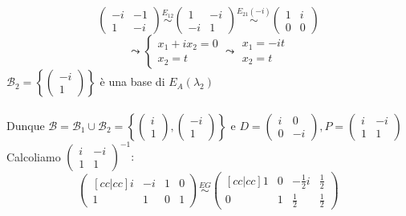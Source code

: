 \documentclass[12pt]{article}
\begin{document}
\[\begin{pmatrix}
    -i & -1\\
    1 & -i
\end{pmatrix} \stackrel{E_{12}}{\sim} \begin{pmatrix}
    1 & -i\\
    -i & 1
\end{pmatrix} \stackrel{E_{21}(-i)}{\sim} \begin{pmatrix}
    1 & i\\
    0 & 0
\end{pmatrix}\]
\[\leadsto \begin{cases}
    x_1 + ix_2 = 0\\
    x_2 = t
\end{cases} \leadsto \begin{matrix}
    x_1 = -it\\
    x_2 = t
\end{matrix}\]
$\mathcal{B}_2 = \left\{\begin{pmatrix}
    -i\\
    1
\end{pmatrix}\right\}$ è una base di $E_A(\lambda_2)$\\\\
Dunque $\mathcal{B} = \mathcal{B}_1 \cup \mathcal{B_2} = \left\{\begin{pmatrix}
    i\\
    1
\end{pmatrix}, \begin{pmatrix}
    -i\\
    1
\end{pmatrix}\right\}$ e $D= \begin{pmatrix}
    i & 0\\
    0 & -i
\end{pmatrix}, P = \begin{pmatrix}
    i & -i\\
    1 & 1
\end{pmatrix}$\\
Calcoliamo $\begin{pmatrix}
    i & -i\\
    1 & 1
\end{pmatrix}^{-1}:$
\[\begin{pmatrix}[cc|cc]
    i & -i & 1 & 0\\
    1 & 1 & 0 & 1
\end{pmatrix} \stackrel{EG}{\sim} \begin{pmatrix}[cc|cc]
    1 & 0 & -\frac{1}{2}i & \frac{1}{2}\\
    0 & 1 & \frac{1}{2} & \frac{1}{2}
\end{pmatrix}\]
\end{document}
